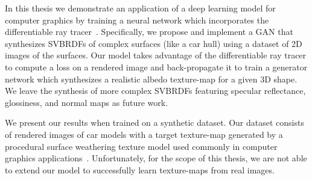 In this thesis we demonstrate an application of a deep learning model for computer graphics
by training a neural network which incorporates the differentiable ray
tracer~\cite{li2018differentiable}. Specifically, we propose and implement a GAN that synthesizes
SVBRDFs of complex surfaces (like a car hull) using a dataset of 2D images of the surfaces. Our model
takes advantage of the differentiable ray tracer to compute a loss on a rendered image and
back-propagate it to train a generator network which synthesizes a realistic albedo texture-map for a
given 3D shape. We leave the synthesis of more complex SVBRDFs featuring specular reflectance,
glossiness, and normal maps as future work.

We present our results when trained on a synthetic dataset. Our dataset consists of rendered images
of car models with a target texture-map generated by a procedural surface weathering texture model
used commonly in computer graphics applications~\cite{bhandari2018procedural}. Unfortunately, for
the scope of this thesis, we are not able to extend our model to successfully learn texture-maps
from real images.